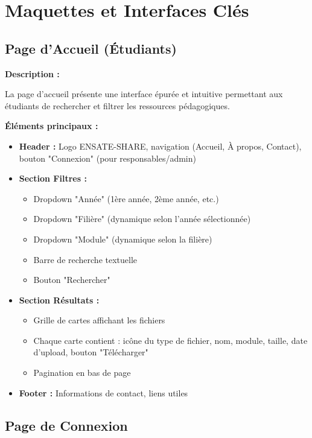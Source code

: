 \documentclass[12pt,a4paper]{article}
\begin{document}
\section{Maquettes et Interfaces Clés}

\subsection{Page d'Accueil (Étudiants)}

\textbf{Description :}

La page d'accueil présente une interface épurée et intuitive permettant aux étudiants de rechercher et filtrer les ressources pédagogiques.

\textbf{Éléments principaux :}
\begin{itemize}[leftmargin=*]
    \item \textbf{Header :} Logo ENSATE-SHARE, navigation (Accueil, À propos, Contact), bouton "Connexion" (pour responsables/admin)
    \item \textbf{Section Filtres :} 
    \begin{itemize}
        \item Dropdown "Année" (1ère année, 2ème année, etc.)
        \item Dropdown "Filière" (dynamique selon l'année sélectionnée)
        \item Dropdown "Module" (dynamique selon la filière)
        \item Barre de recherche textuelle
        \item Bouton "Rechercher"
    \end{itemize}
    \item \textbf{Section Résultats :}
    \begin{itemize}
        \item Grille de cartes affichant les fichiers
        \item Chaque carte contient : icône du type de fichier, nom, module, taille, date d'upload, bouton "Télécharger"
        \item Pagination en bas de page
    \end{itemize}
    \item \textbf{Footer :} Informations de contact, liens utiles
\end{itemize}

\subsection{Page de Connexion}
\end{document}
